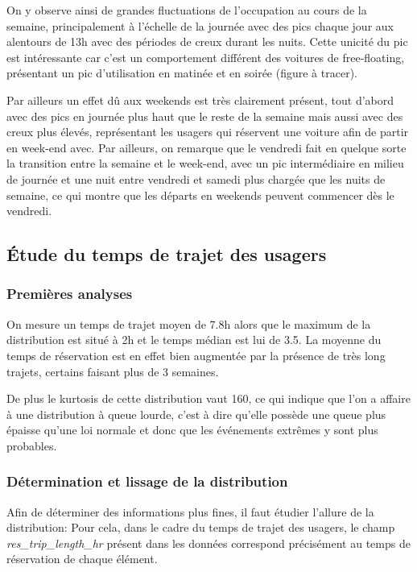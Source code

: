\documentclass[12pt,a4paper]{article}
\theoremstyle{definition}
\begin{document}
{On y observe ainsi de grandes fluctuations de l'occupation au cours de la semaine, principalement à l'échelle de la journée avec des pics chaque jour aux alentours de 13h avec des périodes de creux durant les nuits.
Cette unicité du pic est intéressante car c'est un comportement différent des voitures de free-floating, présentant un pic d'utilisation en matinée et en soirée (figure à tracer).

Par ailleurs un effet dû aux weekends est très clairement présent, tout d'abord avec des pics en journée plus haut que le reste de la semaine mais aussi avec des creux plus élevés, représentant les usagers qui réservent une voiture afin de partir en week-end avec. Par ailleurs, on remarque que le vendredi fait en quelque sorte la transition entre la semaine et le week-end, avec un pic intermédiaire en milieu de journée et une nuit entre vendredi et samedi plus chargée que les nuits de semaine, ce qui montre que les départs en weekends peuvent commencer dès le vendredi.






\subsection{Étude du temps de trajet des usagers}


\subsubsection{Premières analyses}

On mesure un temps de trajet moyen de 7.8h alors que le maximum de la distribution est situé à 2h et le temps médian est lui de 3.5. La moyenne du temps de réservation est en effet bien augmentée par la présence de très long trajets, certains faisant plus de 3 semaines.

De plus le kurtosis de cette distribution vaut 160, ce qui indique que l'on a affaire à une distribution à queue lourde, c'est à dire qu'elle possède une queue plus épaisse qu'une loi normale et donc que les événements extrêmes y sont plus probables.



\subsubsection{Détermination et lissage de la distribution}

Afin de déterminer des informations plus fines, il faut étudier l'allure de la distribution:
Pour cela, dans le cadre du temps de trajet des usagers, le champ \emph{res\_trip\_length\_hr} présent dans les données correspond précisément au temps de réservation de chaque élément.

}
\end{document}
